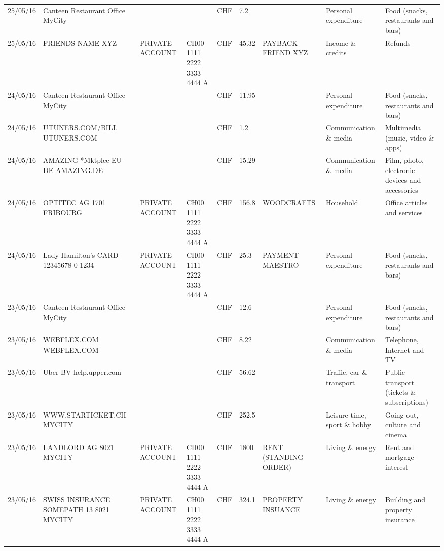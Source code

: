\begin{landscape}
\begin{table}[t]
\begin{center}
\begin{tabular}{lllllllll}
		25/05/16 & Canteen Restaurant Office      MyCity &       &       & CHF   & 7.2   &       & Personal expenditure & Food (snacks, restaurants and bars) \\
		25/05/16 & FRIENDS NAME XYZ & PRIVATE ACCOUNT & CH00 1111 2222 3333 4444 A & CHF   & 45.32 & PAYBACK FRIEND XYZ & Income \& credits & Refunds \\
		24/05/16 & Canteen Restaurant Office      MyCity &       &       & CHF   & 11.95 &       & Personal expenditure & Food (snacks, restaurants and bars) \\
		24/05/16 & UTUNERS.COM/BILL          UTUNERS.COM &       &       & CHF   & 1.2   &       & Communication \& media & Multimedia (music, video \& apps) \\
		24/05/16 & AMAZING *Mktplce EU-DE    AMAZING.DE &       &       & CHF   & 15.29 &       & Communication \& media & Film, photo, electronic devices and accessories \\
		24/05/16 & OPTITEC AG 1701 FRIBOURG & PRIVATE ACCOUNT & CH00 1111 2222 3333 4444 A & CHF   & 156.8 & WOODCRAFTS & Household & Office articles and services \\
		24/05/16 & Lady Hamilton's CARD 12345678-0 1234 & PRIVATE ACCOUNT & CH00 1111 2222 3333 4444 A & CHF   & 25.3  & PAYMENT MAESTRO & Personal expenditure & Food (snacks, restaurants and bars) \\
		23/05/16 & Canteen Restaurant Office      MyCity &       &       & CHF   & 12.6  &       & Personal expenditure & Food (snacks, restaurants and bars) \\
		23/05/16 & WEBFLEX.COM              WEBFLEX.COM &       &       & CHF   & 8.22  &       & Communication \& media & Telephone,  Internet and TV \\
		23/05/16 & Uber BV                  help.upper.com &       &       & CHF   & 56.62 &       & Traffic, car \& transport & Public transport (tickets \& subscriptions) \\
		23/05/16 & WWW.STARTICKET.CH        MYCITY &       &       & CHF   & 252.5 &       & Leisure time, sport \& hobby & Going out, culture and cinema \\
		23/05/16 & LANDLORD AG 8021 MYCITY & PRIVATE ACCOUNT & CH00 1111 2222 3333 4444 A & CHF   & 1800  & RENT (STANDING ORDER) & Living \& energy & Rent and mortgage interest \\
		23/05/16 & SWISS INSURANCE SOMEPATH 13 8021 MYCITY & PRIVATE ACCOUNT & CH00 1111 2222 3333 4444 A & CHF   & 324.1 & PROPERTY INSUANCE & Living \& energy & Building and property insurance \\

\end{tabular}
\end{center}
\end{table}
\end{landscape}
